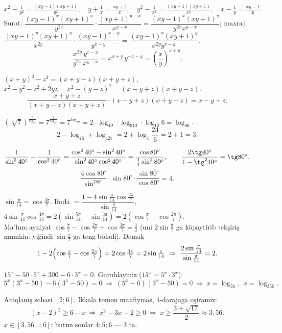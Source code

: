 \[x^2-\tfrac1{y^2}=\tfrac{(xy-1)(xy+1)}{y^2},\quad y+\tfrac1x=\tfrac{xy+1}x,\quad y^2-\tfrac1{x^2}=\tfrac{(xy-1)(xy+1)}{x^2},\quad x-\tfrac1y=\tfrac{xy-1}y.\]
Surat: $\dfrac{(xy-1)^x(xy+1)^x}{y^{2x}}\cdot\dfrac{(xy+1)^{y-x}}{x^{y-x}}=\dfrac{(xy-1)^x(xy+1)^y}{y^{2x}x^{y-x}}$; \quad maxraj: $\dfrac{(xy-1)^y(xy+1)^y}{x^{2y}}\cdot\dfrac{(xy-1)^{x-y}}{y^{x-y}}=\dfrac{(xy-1)^x(xy+1)^y}{x^{2y}y^{x-y}}$.
\[\frac{x^{2y}\,y^{x-y}}{y^{2x}\,x^{y-x}}=x^{x+y}\,y^{-x-y}=\left(\frac xy\right)^{x+y}.\]

$(x+y)^2-z^2=(x+y-z)(x+y+z)$, \quad $x^2-y^2-z^2+2yz=x^2-(y-z)^2=(x-y+z)(x+y-z)$.
\[\frac{x+y+z}{(x+y-z)(x+y+z)}\cdot(x-y+z)(x+y-z)=x-y+z.\]

$\left(\sqrt[3]7\right)^{\frac3{\log_27}}=7^{\frac1{\log_27}}=7^{\log_72}=2$. \quad $\log_49\cdot\log_913\cdot\log_{13}6=\log_46$.
\[2-\log_46+\log_424=2+\log_4\frac{24}6=2+1=3.\]

\[\frac1{\sin^240^\circ}-\frac1{\cos^240^\circ}=\frac{\cos^240^\circ-\sin^240^\circ}{\sin^240^\circ\cos^240^\circ}=\frac{\cos80^\circ}{\frac14\sin^280^\circ},\qquad \frac{2\tg40^\circ}{1-\tg^240^\circ}=\tg80^\circ.\]
\[\frac{4\cos80^\circ}{\sin^280^\circ}\cdot\sin80^\circ\cdot\frac{\sin80^\circ}{\cos80^\circ}=4.\]

$\sin\frac\pi{14}=\cos\frac{3\pi}7$. Ifoda $=\dfrac{1-4\sin\frac\pi{14}\cos\frac{2\pi}7}{\sin\frac\pi{14}}$, \ $4\sin\frac\pi{14}\cos\frac{4\pi}{14}=2\left(\sin\frac{5\pi}{14}-\sin\frac{3\pi}{14}\right)=2\left(\cos\frac\pi7-\cos\frac{2\pi}7\right)$.\\
Ma'lum ayniyat $\cos\frac\pi7-\cos\frac{2\pi}7+\cos\frac{3\pi}7=\frac12$ (uni $2\sin\frac\pi7$ ga köpaytirib tekşiriş mumkin: yiğindi $\sin\frac\pi7$ ga teng böladi). Demak
\[1-2\Bigl(\cos\tfrac\pi7-\cos\tfrac{2\pi}7\Bigr)=2\cos\tfrac{3\pi}7=2\sin\tfrac\pi{14}\ \Rightarrow\ \frac{2\sin\frac\pi{14}}{\sin\frac\pi{14}}=2.\]

$15^x-50\cdot5^x+300-6\cdot3^x=0$. Guruhlaymiz ($15^x=5^x\cdot3^x$):
\[5^x(3^x-50)-6(3^x-50)=0\ \Rightarrow\ (5^x-6)(3^x-50)=0\ \Rightarrow\ x=\log_56,\ \ x=\log_350.\]

Aniqlaniş sohasi $[2;6]$. Ikkala tomon manfiymas, 4-darajaga oşiramiz:
\[(x-2)^2\ge6-x\ \Rightarrow\ x^2-3x-2\ge0\ \Rightarrow\ x\ge\frac{3+\sqrt{17}}2\approx3{,}56.\]
$x\in[3{,}56\ldots;6]$: butun sonlar $4;5;6$ — 3 ta.

